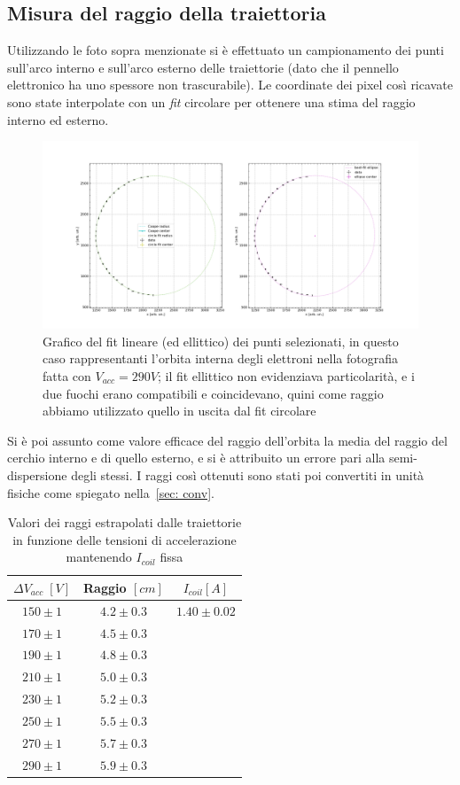 \documentclass[10pt, a4paper, italian]{article}
\begin{document}
\subsection{Misura del raggio della traiettoria}
Utilizzando le foto sopra menzionate si è effettuato un campionamento dei punti
sull'arco interno e sull'arco esterno delle traiettorie (dato che il pennello elettronico ha uno spessore non trascurabile). Le coordinate dei pixel così ricavate
sono state interpolate con un \emph{fit} circolare per ottenere una stima del
raggio interno ed esterno.
\begin{figure}
\includegraphics[width=\textwidth]{circfit}
\caption{Grafico del fit lineare (ed ellittico) dei punti selezionati, in questo caso rappresentanti l'orbita interna degli elettroni nella fotografia fatta con $V_{acc}=290 V$; il fit ellittico non evidenziava particolarità, e i due fuochi erano compatibili e coincidevano, quini come raggio abbiamo utilizzato quello in uscita dal fit circolare}
\end{figure}
Si è poi assunto come valore efficace del raggio
dell'orbita la media del raggio del cerchio interno e di quello esterno,
e si è attribuito un errore pari alla semi-dispersione degli stessi.
I raggi così ottenuti sono stati poi convertiti in unità fisiche come spiegato
nella~\cref{sec: conv}. \\
\begin{table}[htbp]
\centering
\begin{tabular}{cc|c}
\toprule
$\Delta V_{acc} \; [\si{V}]$ & Raggio $[\si{cm}]$ & $I_{coil} [A]$ \\
\midrule

$150 \pm 1$ & $4.2 \pm 0.3$ & $1.40 \pm 0.02$\\
$170 \pm 1$ & $4.5 \pm 0.3$ & \\
$190 \pm 1$ & $4.8 \pm 0.3$ & \\
$210 \pm 1$ & $5.0 \pm 0.3$ & \\
$230 \pm 1$ & $5.2 \pm 0.3$ & \\
$250 \pm 1$ & $5.5 \pm 0.3$ & \\
$270 \pm 1$ & $5.7 \pm 0.3$ & \\
$290 \pm 1$ & $5.9 \pm 0.3$ & \\
\bottomrule
\end{tabular}
\caption{Valori dei raggi estrapolati dalle traiettorie in funzione delle tensioni di accelerazione mantenendo $I_{coil}$ fissa}
\end{table}
\end{document}
